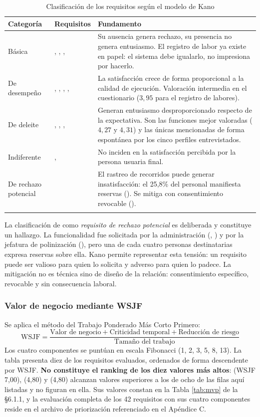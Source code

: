 \begin{longtable}{|L{2.8cm}|L{5.4cm}|L{7.0cm}|}
\hline
{}\textbf{Categoría} & \textbf{Requisitos} & \textbf{Fundamento} \\
\hline
\endhead
Básica & , , ,  & Su ausencia genera rechazo, su presencia no genera entusiasmo. El registro de labor ya existe en papel: el sistema debe igualarlo, no impresiona por hacerlo. \\ \hline
De desempeño & , , , ,  & La satisfacción crece de forma proporcional a la calidad de ejecución. Valoración intermedia en el cuestionario ($3{,}95$ para el registro de labores). \\ \hline
{}De deleite & , , ,  & Generan entusiasmo desproporcionado respecto de la expectativa. Son las funciones mejor valoradas ($4{,}27$ y $4{,}31$) y las únicas mencionadas de forma espontánea por los cinco perfiles entrevistados. \\ \hline
Indiferente & ,  & No inciden en la satisfacción percibida por la persona usuaria final. \\ \hline
De rechazo potencial &  & El rastreo de recorridos puede generar insatisfacción: el 25{,}8\% del personal manifiesta reservas (). Se mitiga con consentimiento revocable (). \\ \hline
\caption{Clasificación de los requisitos según el modelo de Kano}
\end{longtable}

\noindent
La clasificación de  como \emph{requisito de rechazo potencial} es deliberada y
constituye un hallazgo. La funcionalidad fue solicitada por la administración (,
) y por la jefatura de polinización (), pero una de cada cuatro personas
destinatarias expresa reservas sobre ella. Kano permite representar esta tensión: un requisito puede
ser valioso para quien lo solicita y adverso para quien lo padece. La mitigación no es técnica sino
de diseño de la relación: consentimiento específico, revocable y sin consecuencia laboral.

\subsubsection{Valor de negocio mediante WSJF}

Se aplica el método del Trabajo Ponderado Más Corto Primero:
\[
\mathrm{WSJF} = \frac{\text{Valor de negocio} + \text{Criticidad temporal} + \text{Reducción de riesgo}}{\text{Tamaño del trabajo}}
\]
Los cuatro componentes se puntúan en escala Fibonacci (1, 2, 3, 5, 8, 13). La tabla presenta diez
de los requisitos evaluados, ordenados de forma descendente por WSJF. \textbf{No constituye el
ranking de los diez valores más altos}:  (WSJF 7,00),  (4,80) y 
(4,80) alcanzan valores superiores a los de ocho de las filas aquí listadas y no figuran en ella.
Sus valores constan en la Tabla \ref{tab:mvp} de la §6.1.1, y la evaluación completa de los 42
requisitos con sus cuatro componentes reside en el archivo de priorización referenciado en el
Apéndice C.

